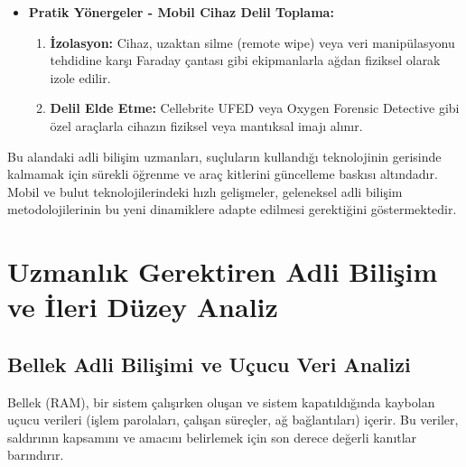 \begin{itemize}
\begin{itemize}
\begin{itemize}
    \item \textbf{Pratik Yönergeler - Mobil Cihaz Delil Toplama:}
    \begin{enumerate}
        \item \textbf{İzolasyon:} Cihaz, uzaktan silme (remote wipe) veya veri manipülasyonu tehdidine karşı Faraday çantası gibi ekipmanlarla ağdan fiziksel olarak izole edilir.
        \item \textbf{Delil Elde Etme:} Cellebrite UFED veya Oxygen Forensic Detective gibi özel araçlarla cihazın fiziksel veya mantıksal imajı alınır.
    \end{enumerate}
\end{itemize}
Bu alandaki adli bilişim uzmanları, suçluların kullandığı teknolojinin gerisinde kalmamak için sürekli öğrenme ve araç kitlerini güncelleme baskısı altındadır. Mobil ve bulut teknolojilerindeki hızlı gelişmeler, geleneksel adli bilişim metodolojilerinin bu yeni dinamiklere adapte edilmesi gerektiğini göstermektedir.

\section{Uzmanlık Gerektiren Adli Bilişim ve İleri Düzey Analiz}

\subsection{Bellek Adli Bilişimi ve Uçucu Veri Analizi}

Bellek (RAM), bir sistem çalışırken oluşan ve sistem kapatıldığında kaybolan uçucu verileri (işlem parolaları, çalışan süreçler, ağ bağlantıları) içerir. Bu veriler, saldırının kapsamını ve amacını belirlemek için son derece değerli kanıtlar barındırır.


\end{itemize}
\end{itemize}
